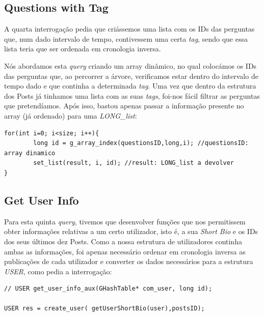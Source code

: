 \documentclass[a4paper, 11pt, oneside]{article}
\begin{document}
\subsection{Questions with Tag}
A quarta interrogação pedia que criássemos uma lista com os IDs das perguntas que, num dado intervalo de tempo, contivessem uma certa \textit{tag}, sendo que essa lista teria que ser ordenada em cronologia inversa.

Nós abordamos esta \textit{query} criando um array dinâmico, no qual colocámos os IDs das perguntas que, ao percorrer a árvore, verificamos estar dentro do intervalo de tempo dado e que continha a determinada \textit{tag}. Uma vez que dentro da estrutura dos Posts já tinhamos uma lista com as suas \textit{tags}, foi-nos fácil filtrar as perguntas que pretendíamos. Após isso, bastou apenas passar a informação presente no array (já ordenado) para uma \textit{LONG\_list}:
\begin{lstlisting}[caption=Query 4 - array dinâmico para LONG\_list]
for(int i=0; i<size; i++){
		long id = g_array_index(questionsID,long,i); //questionsID: array dinamico
		set_list(result, i, id); //result: LONG_list a devolver
}
\end{lstlisting}

\subsection{Get User Info}
Para esta quinta \textit{query}, tivemos que desenvolver funções que nos permitissem obter informações relativas a um certo utilizador, isto é, a sua \textit{Short Bio} e os IDs dos seus últimos dez Posts. Como a nossa estrutura de utilizadores continha ambas as informações, foi apenas necessário ordenar em cronologia inversa as publicações de cada utilizador e converter os dados necessários para a estrutura \textit{USER}, como pedia a interrogação:
\begin{lstlisting}[caption=Query 5 - tipo da função auxiliar e passagem para estrutura USER]
// USER get_user_info_aux(GHashTable* com_user, long id);

USER res = create_user( getUserShortBio(user),postsID);
\end{lstlisting}
\end{document}
